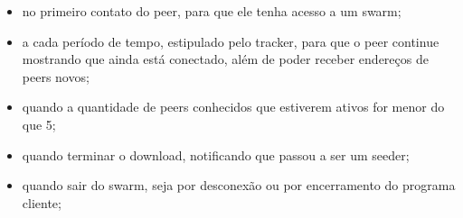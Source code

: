 \begin{itemize}
    \item no primeiro contato do \gls*{peer}, para que ele tenha acesso a um
        \gls*{swarm};

    \item a cada período de tempo, estipulado pelo tracker, para que o \gls*{peer}
        continue mostrando que ainda está conectado, além de poder receber endereços de
        \glspl*{peer} novos;

    \item quando a quantidade de \glspl*{peer} conhecidos que estiverem ativos for
        menor do que 5;

    \item quando terminar o download, notificando que passou a ser um \gls*{seeder};

    \item quando sair do \gls*{swarm}, seja por desconexão ou por encerramento do
        programa cliente;
\end{itemize}